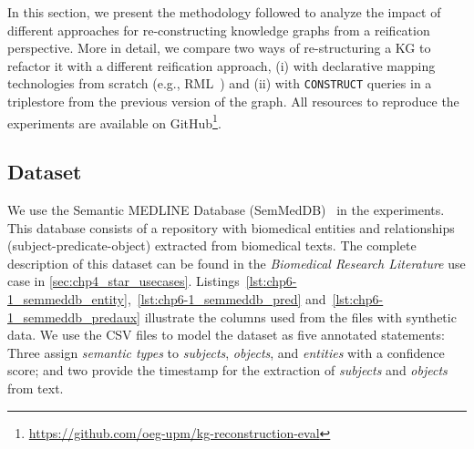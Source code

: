 In this section, we present the methodology followed to analyze the impact of different approaches for re-constructing knowledge graphs from a reification perspective. More in detail, we compare two ways of re-structuring a KG to refactor it with a different reification approach, (i) with declarative mapping technologies from scratch (e.g., RML~\parencite{Dimou2014rml,iglesias2023rml}) and (ii) with \texttt{CONSTRUCT} queries in a triplestore from the previous version of the graph. 
All resources to reproduce the experiments are available on GitHub\footnote{\url{https://github.com/oeg-upm/kg-reconstruction-eval}}.



\subsection{Dataset}
\label{sec:chp6-1_dataset}


We use the Semantic MEDLINE Database (SemMedDB)~\parencite{SemMedDB} in the experiments. This database consists of a repository with biomedical entities and relationships (subject-predicate-object) extracted from biomedical texts. The complete description of this dataset can be found in the \textit{Biomedical Research Literature} use case in \cref{sec:chp4_star_usecases}. Listings~\ref{lst:chp6-1_semmeddb_entity},~\ref{lst:chp6-1_semmeddb_pred} and~\ref{lst:chp6-1_semmeddb_predaux} illustrate the columns used from the files with synthetic data.
We use the CSV files to model the dataset as five annotated statements: 
Three assign \textit{semantic types} to \textit{subjects}, \textit{objects}, and \textit{entities} with a confidence score; and two provide the timestamp for the extraction of \textit{subjects} and \textit{objects} from text. 


